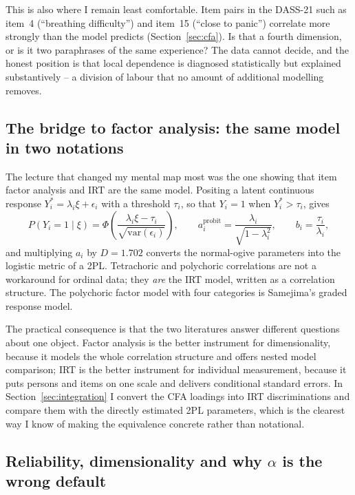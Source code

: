 \documentclass[11pt,a4paper]{article}
\newcommand{\itemno}[1]{item~#1}
\begin{document}
This is also where I remain least comfortable. Item pairs in the DASS-21 such as
\itemno{4} (``breathing difficulty'') and \itemno{15} (``close to panic'')
correlate more strongly than the model predicts (Section~\ref{sec:cfa}). Is that a
fourth dimension, or is it two paraphrases of the same experience? The data cannot
decide, and the honest position is that local dependence is diagnosed statistically
but explained substantively -- a division of labour that no amount of additional
modelling removes.

\subsection{The bridge to factor analysis: the same model in two notations}

The lecture that changed my mental map most was the one showing that item factor
analysis and IRT are the same model. Positing a latent continuous response
$Y_i^{*}=\lambda_i\xi+\epsilon_i$ with a threshold $\tau_i$, so that $Y_i=1$ when
$Y_i^{*}>\tau_i$, gives
\begin{equation}
P(Y_i=1\mid\xi)=\Phi\!\left(\frac{\lambda_i\xi-\tau_i}{\sqrt{\mathrm{var}(\epsilon_i)}}\right),
\qquad
a_i^{\text{probit}}=\frac{\lambda_i}{\sqrt{1-\lambda_i^{2}}},
\qquad
b_i=\frac{\tau_i}{\lambda_i},
\end{equation}
and multiplying $a_i$ by $D=1.702$ converts the normal-ogive parameters into the
logistic metric of a 2PL. Tetrachoric and polychoric correlations are not a
workaround for ordinal data; they \emph{are} the IRT model, written as a
correlation structure. The polychoric factor model with four categories is
Samejima's graded response model.

The practical consequence is that the two literatures answer different questions
about one object. Factor analysis is the better instrument for dimensionality,
because it models the whole correlation structure and offers nested model
comparison; IRT is the better instrument for individual measurement, because it
puts persons and items on one scale and delivers conditional standard errors.
In Section~\ref{sec:integration} I convert the CFA loadings into IRT
discriminations and compare them with the directly estimated 2PL parameters, which
is the clearest way I know of making the equivalence concrete rather than
notational.

\subsection{Reliability, dimensionality and why $\alpha$ is the wrong default}
\end{document}
